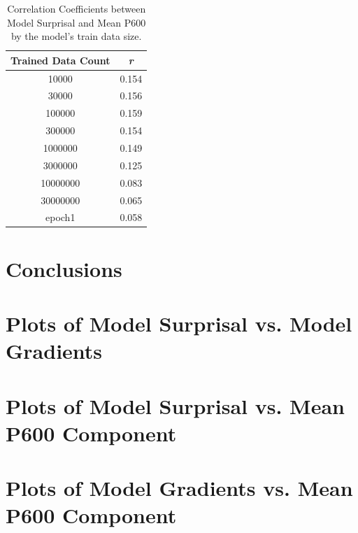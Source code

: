 \documentclass{IEEEtran}
\begin{document}
\begin{table}
    \centering
    \begin{tabular}{c|c}
        \textbf{Trained Data Count} & \textbf{\textit{r}} \\
        \hline
        10000&0.154\\
        30000&0.156\\
        100000&0.159\\
        300000&0.154\\
        1000000&0.149\\
        3000000&0.125\\
        10000000&0.083\\
        30000000&0.065\\
        epoch1&0.058
    \end{tabular}
    \caption{Correlation Coefficients between Model Surprisal and Mean P600 by the model's train data size.}
    \label{tab:correlation_suprisal_p600}
\end{table}

\section{Conclusions}




\onecolumn
\appendix
\section{Plots of Model Surprisal vs. Model Gradients}

\section{Plots of Model Surprisal vs. Mean P600 Component}

\section{Plots of Model Gradients vs. Mean P600 Component}
\end{document}
